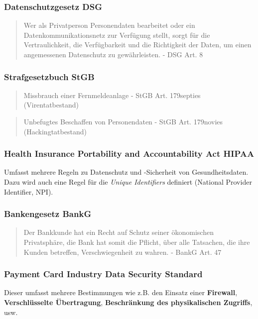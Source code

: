 \subsubsection{Datenschutzgesetz DSG}
\begin{quotation}
	Wer als Privatperson Personendaten bearbeitet oder ein Datenkommunikationsnetz zur Verfügung stellt, sorgt für die Vertraulichkeit, die Verfügbarkeit und die Richtigkeit der Daten, um einen angemessenen Datenschutz zu gewährleisten. - DSG Art. 8
\end{quotation}

\subsubsection{Strafgesetzbuch StGB}
\begin{quotation}
	Missbrauch einer Fernmeldeanlage - StGB Art. 179septies (Virentatbestand)
\end{quotation}

\begin{quotation}
	Unbefugtes Beschaffen von Personendaten - StGB Art. 179novies (Hackingtatbestand)
\end{quotation}

\subsubsection{Health Insurance Portability and Accountability Act HIPAA}
Umfasst mehrere Regeln zu Datenschutz und -Sicherheit von Gesundheitsdaten. Dazu wird auch eine Regel für die \textit{Unique Identifiers} definiert (National Provider Identifier, NPI).

\subsubsection{Bankengesetz BankG}
\begin{quotation}
	Der Bankkunde hat ein Recht auf Schutz seiner ökonomischen Privatsphäre, die Bank hat somit die Pflicht, über alle Tatsachen, die ihre Kunden betreffen, Verschwiegenheit zu wahren. - BankG Art. 47
\end{quotation}

\subsubsection{Payment Card Industry Data Security Standard}
Dieser umfasst mehrere Bestimmungen wie z.B. den Einsatz einer \textbf{Firewall}, \textbf{Verschlüsselte Übertragung}, \textbf{Beschränkung des physikalischen Zugriffs}, usw.

